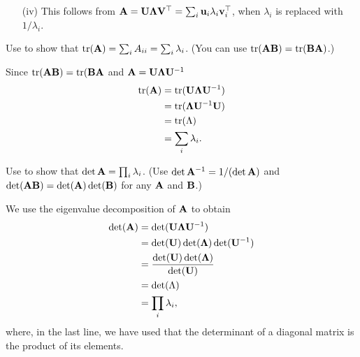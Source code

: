\begin{exenumerate}
\begin{solution}
\begin{enumerate}
    \item[(iv)] This follows from $\mathbf{A} = \mathbf{U} \mathbf{\Lambda} \mathbf{V}^\top = \sum_i \mathbf{u}_i \lambda_i \mathbf{v}_i^\top$, when $\lambda_i$ is replaced with $1/\lambda_i$.
    \end{enumerate}
  \end{solution}  
\end{exenumerate}


\label{ex:trace-determinants-eigenvalues}
\begin{exenumerate}
\item Use  to show that $\operatorname{tr}(\mathbf{A})=\sum_i A_{ii} = \sum_i\lambda_i$. (You can use $\operatorname{tr}(\mathbf{A}\mathbf{B})=\operatorname{tr}(\mathbf{B}\mathbf{A})$.)
  \begin{solution}
    Since $\operatorname{tr}(\mathbf{A}\mathbf{B}) = \operatorname{tr}(\mathbf{B}\mathbf{A}$ and $\mathbf{A} = \mathbf{U}\mathbf{\Lambda} \mathbf{U}^{-1}$
    \begin{align}
      \operatorname{tr}(\mathbf{A})  &= \operatorname{tr}(\mathbf{U}\mathbf{\Lambda} \mathbf{U}^{-1}) \\
               &= \operatorname{tr}(\mathbf{\Lambda} \mathbf{U}^{-1}\mathbf{U}) \\
               &= \operatorname{tr}(\Lambda)\\
               &= \sum_i \lambda_i.
    \end{align}
  \end{solution}

\item Use  to show that $\det \mathbf{A} = \prod_i \lambda_i$. (Use $\det \mathbf{A}^{-1}=1/(\det \mathbf{A})$ and $\det(\mathbf{A}\mathbf{B})=\det(\mathbf{A})\det(\mathbf{B})$ for any $\mathbf{A}$ and $\mathbf{B}$.)
  \begin{solution}
    We use the eigenvalue decomposition of $\mathbf{A}$ to obtain
    \begin{align}
      \det(\mathbf{A}) &= \det(\mathbf{U}\mathbf{\Lambda} \mathbf{U}^{-1})\\
               &= \det(\mathbf{U})\det(\mathbf{\Lambda})\det(\mathbf{U}^{-1}) \\
               &= \frac{\det(\mathbf{U})\det(\mathbf{\Lambda})}{\det(\mathbf{U})}\\
               &= \det(\Lambda)\\
               &= \prod_i \lambda_i,
    \end{align}
    where, in the last line, we have used that the determinant of a diagonal matrix is the product of its elements.

  \end{solution}
\end{exenumerate}



